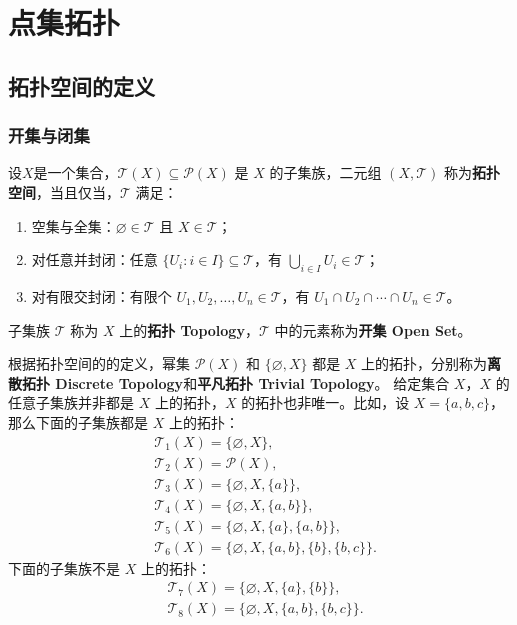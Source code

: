 \chapter{点集拓扑}

\section{拓扑空间的定义}

\subsection{开集与闭集}
\begin{definition}
    设$ X $是一个集合，$ \mathcal{T}(X) \subseteq \mathcal{P}(X) $ 是 $ X $ 的子集族，二元组 $ (X,\mathcal{T}) $ 称为\textbf{拓扑空间}，当且仅当，$ \mathcal{T} $ 满足：
    \begin{enumerate}
        \item 空集与全集：$ \varnothing \in \mathcal{T} $ 且 $ X \in \mathcal{T} $；
        \item 对任意并封闭：任意 $ \{U_i:i\in I\} \subseteq \mathcal{T} $，有 $ \bigcup_{i\in I} U_i \in \mathcal{T} $；
        \item 对有限交封闭：有限个 $ U_1,U_2,\ldots,U_n\in \mathcal{T} $，有 $ U_1\cap U_2\cap \cdots \cap U_n \in \mathcal{T} $。
    \end{enumerate}
    子集族 $ \mathcal{T} $ 称为 $ X $ 上的\textbf{拓扑 Topology}，$ \mathcal{T} $ 中的元素称为\textbf{开集 Open Set}。
    \label{definition:topological_space}
\end{definition}

\begin{note}
    根据拓扑空间的的定义，幂集 $ \mathcal{P}(X) $ 和 $ \{\varnothing,X\} $ 都是 $ X $ 上的拓扑，分别称为\textbf{离散拓扑 Discrete Topology}和\textbf{平凡拓扑 Trivial Topology}。
    给定集合 $X$，$X$ 的任意子集族并非都是 $X$ 上的拓扑，$X$ 的拓扑也非唯一。比如，设 $ X=\{a,b,c\} $，那么下面的子集族都是 $ X $ 上的拓扑：
    \begin{align*}
        &\mathcal{T}_1(X)=\{\varnothing,X\},\\
        &\mathcal{T}_2(X)=\mathcal{P}(X),\\
        &\mathcal{T}_3(X)=\{\varnothing,X,\{a\}\},\\
        &\mathcal{T}_4(X)=\{\varnothing,X,\{a,b\}\},\\
        &\mathcal{T}_5(X)=\{\varnothing,X,\{a\},\{a,b\}\},\\
        &\mathcal{T}_6(X)=\{\varnothing,X,\{a,b\},\{b\},\{b,c\}\}.
    \end{align*}
    下面的子集族不是 $ X $ 上的拓扑：
    \begin{align*}
        &\mathcal{T}_7(X)=\{\varnothing,X,\{a\},\{b\}\},\\
        &\mathcal{T}_8(X)=\{\varnothing,X,\{a,b\},\{b,c\}\}.
    \end{align*}
\end{note}
\vspace{1em}

